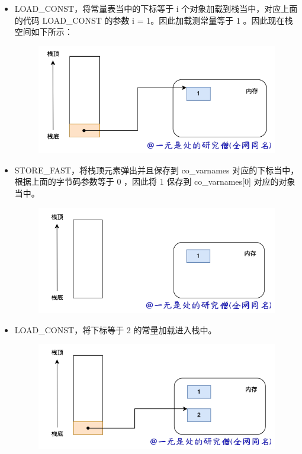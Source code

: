\begin{itemize}
\item LOAD\_CONST，将常量表当中的下标等于 i 个对象加载到栈当中，对应上面的代码  LOAD\_CONST 的参数 i = 1。因此加载测常量等于 1 。因此现在栈空间如下所示： 

    \begin{figure}[H]
        \centering
            \includegraphics[scale=.2]{images/39-codeobject.png}
						\caption{ }
        \label{fig:my_label}
    \end{figure}
    
\item STORE\_FAST，将栈顶元素弹出并且保存到 co\_varnames 对应的下标当中，根据上面的字节码参数等于 0 ，因此将 1 保存到 co\_varnames[0] 对应的对象当中。 

    \begin{figure}[H]
        \centering
            \includegraphics[scale=.2]{images/40-codeobject.png}
						\caption{ }
        \label{fig:my_label}
    \end{figure}
    
\item LOAD\_CONST，将下标等于 2 的常量加载进入栈中。 

    \begin{figure}[H]
        \centering
            \includegraphics[scale=.2]{images/41-codeobject.png}
						\caption{ }
        \label{fig:my_label}
    \end{figure}
    

\end{itemize}

